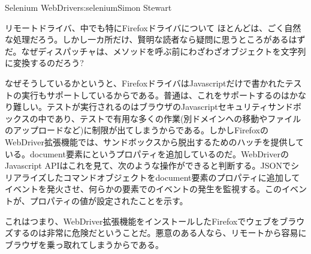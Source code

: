 \begin{aosachapter}{Selenium WebDriver}{s:selenium}{Simon Stewart}
\begin{aosasect1}{リモートドライバ、中でも特にFirefoxドライバについて}
ほとんどは、ごく自然な処理だろう。しかし一カ所だけ、賢明な読者なら疑問に思うところがあるはずだ。なぜディスパッチャは、メソッドを呼ぶ前にわざわざオブジェクトを文字列に変換するのだろう?

なぜそうしているかというと、FirefoxドライバはJavascriptだけで書かれたテストの実行もサポートしているからである。普通は、これをサポートするのはかなり難しい。テストが実行されるのはブラウザのJavascriptセキュリティサンドボックスの中であり、テストで有用な多くの作業(別ドメインへの移動やファイルのアップロードなど)に制限が出てしまうからである。しかしFirefoxのWebDriver拡張機能では、サンドボックスから脱出するためのハッチを提供している。document要素にというプロパティを追加しているのだ。WebDriverのJavascript APIはこれを見て、次のような操作ができると判断する。JSONでシリアライズしたコマンドオブジェクトをdocument要素のプロパティに追加してイベントを発火させ、何らかの要素でのイベントの発生を監視する。このイベントが、プロパティの値が設定されたことを示す。

これはつまり、WebDriver拡張機能をインストールしたFirefoxでウェブをブラウズするのは非常に危険だということだ。悪意のある人なら、リモートから容易にブラウザを乗っ取れてしまうからである。


\end{aosasect1}
\end{aosachapter}
